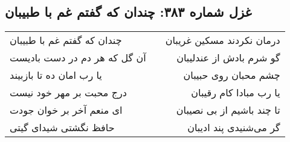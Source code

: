 \begin{center}
\section*{غزل شماره ۳۸۳: چندان که گفتم غم با طبیبان}
\label{sec:sh383}
\begin{longtable}{l p{0.5cm} r}
چندان که گفتم غم با طبیبان
&&
درمان نکردند مسکین غریبان
\\
آن گل که هر دم در دست بادیست
&&
گو شرم بادش از عندلیبان
\\
یا رب امان ده تا بازبیند
&&
چشم محبان روی حبیبان
\\
درج محبت بر مهر خود نیست
&&
یا رب مبادا کام رقیبان
\\
ای منعم آخر بر خوان جودت
&&
تا چند باشیم از بی نصیبان
\\
حافظ نگشتی شیدای گیتی
&&
گر می‌شنیدی پند ادیبان
\\
\end{longtable}
\end{center}
